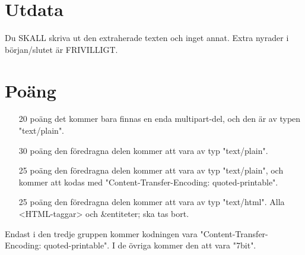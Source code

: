 \section*{Utdata}
Du SKALL skriva ut den extraherade texten och inget annat. Extra nyrader i början/slutet är FRIVILLIGT.

\section*{Poäng}

\begin{enumerate}
	\item[20 poäng] det kommer bara finnas en enda multipart-del, och den är av typen "text/plain".
	\item[30 poäng] den föredragna delen kommer att vara av typ "text/plain".
	\item[25 poäng] den föredragna delen kommer att vara av typ "text/plain", och kommer att kodas med "Content-Transfer-Encoding: quoted-printable".
  \item[25 poäng] den föredragna delen kommer att vara av typ "text/html". Alla <HTML-taggar> och \&entiteter; ska tas bort.
\end{enumerate}

Endast i den tredje gruppen kommer kodningen vara "Content-Transfer-Encoding: quoted-printable". I de övriga kommer den att vara "7bit".
